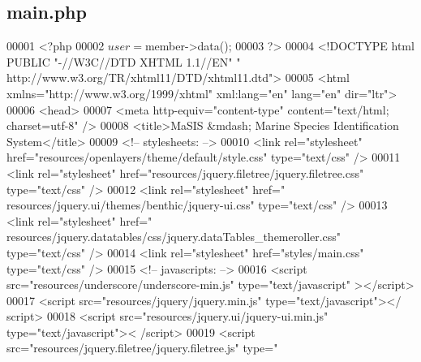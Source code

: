 \hypertarget{main_8php}{\subsection{main.\-php}
\label{main_8php}
}

\begin{DoxyCode}
00001 <?php
00002 $user = $member->data();
00003 ?>
00004 <!DOCTYPE html PUBLIC \textcolor{stringliteral}{"-//W3C//DTD XHTML 1.1//EN"} \textcolor{stringliteral}{"
      http://www.w3.org/TR/xhtml11/DTD/xhtml11.dtd"}>
00005 <html xmlns=\textcolor{stringliteral}{"http://www.w3.org/1999/xhtml"} xml:lang=\textcolor{stringliteral}{"en"} lang=\textcolor{stringliteral}{"en"} dir=\textcolor{stringliteral}{"ltr"}>
00006   <head>
00007     <meta http-equiv=\textcolor{stringliteral}{"content-type"} content=\textcolor{stringliteral}{"text/html; charset=utf-8"} />
00008     <title>MaSIS &mdash; Marine Species Identification System</title>
00009     <!-- stylesheets: -->
00010     <link rel=\textcolor{stringliteral}{"stylesheet"} href=\textcolor{stringliteral}{"resources/openlayers/theme/default/style.css"} 
      type=\textcolor{stringliteral}{"text/css"} />
00011     <link rel=\textcolor{stringliteral}{"stylesheet"} href=\textcolor{stringliteral}{"resources/jquery.filetree/jquery.filetree.css"}
       type=\textcolor{stringliteral}{"text/css"} />
00012     <link rel=\textcolor{stringliteral}{"stylesheet"} href=\textcolor{stringliteral}{"
      resources/jquery.ui/themes/benthic/jquery-ui.css"} type=\textcolor{stringliteral}{"text/css"} />
00013     <link rel=\textcolor{stringliteral}{"stylesheet"} href=\textcolor{stringliteral}{"
      resources/jquery.datatables/css/jquery.dataTables\_themeroller.css"} type=\textcolor{stringliteral}{"text/css"} />
00014     <link rel=\textcolor{stringliteral}{"stylesheet"} href=\textcolor{stringliteral}{"styles/main.css"} type=\textcolor{stringliteral}{"text/css"} />
00015     <!-- javascripts: -->
00016     <script src=\textcolor{stringliteral}{"resources/underscore/underscore-min.js"} type=\textcolor{stringliteral}{"text/javascript"}
      ></script>
00017     <script src=\textcolor{stringliteral}{"resources/jquery/jquery.min.js"} type=\textcolor{stringliteral}{"text/javascript"}></
      script>
00018     <script src=\textcolor{stringliteral}{"resources/jquery.ui/jquery-ui.min.js"} type=\textcolor{stringliteral}{"text/javascript"}><
      /script>
00019     <script src=\textcolor{stringliteral}{"resources/jquery.filetree/jquery.filetree.js"} type=\textcolor{stringliteral}{"
}
\end{DoxyCode}
